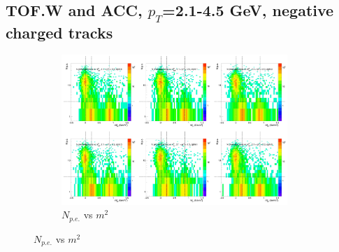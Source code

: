 \subsection{TOF.W and ACC, $p_T$=2.1-4.5 GeV, negative charged tracks}
\label{app:accdata}
\begin{figure}[H]
  \centering
    \begin{subfigure}{1\textwidth}
   \centering
   \includegraphics[width=0.94\textwidth]{hiptfits/neg/PSaccthreshold_cent0_ich0_accfire0_ptbin8.jpg}
    \caption{$N_{p.e.}$ vs $m^2$}
    \end{subfigure}
\end{figure}
